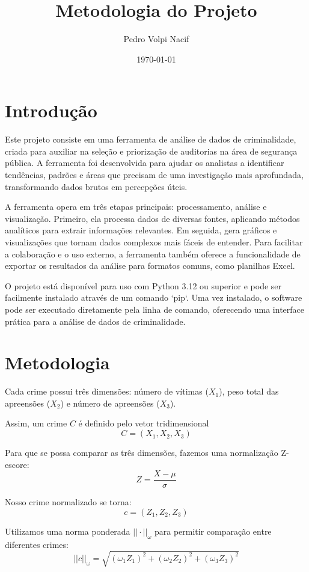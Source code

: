 \documentclass[12pt, a4paper]{article}
\author{Pedro Volpi Nacif}
\title{Metodologia do Projeto}
\date{\today}
\begin{document}
\maketitle

\section{Introdução}
\label{sec:introducao}
Este projeto consiste em uma ferramenta de análise de dados de criminalidade, criada para auxiliar na seleção e priorização de auditorias na área de segurança pública. A ferramenta foi desenvolvida para ajudar os analistas a identificar tendências, padrões e áreas que precisam de uma investigação mais aprofundada, transformando dados brutos em percepções úteis.

A ferramenta opera em três etapas principais: processamento, análise e visualização. Primeiro, ela processa dados de diversas fontes, aplicando métodos analíticos para extrair informações relevantes. Em seguida, gera gráficos e visualizações que tornam dados complexos mais fáceis de entender. Para facilitar a colaboração e o uso externo, a ferramenta também oferece a funcionalidade de exportar os resultados da análise para formatos comuns, como planilhas Excel.

O projeto está disponível para uso com Python 3.12 ou superior e pode ser facilmente instalado através de um comando `pip`. Uma vez instalado, o software pode ser executado diretamente pela linha de comando, oferecendo uma interface prática para a análise de dados de criminalidade.

\section{Metodologia}
\label{sec:metodologia}
Cada crime possui três dimensões: número de vítimas (\( X_1 \)), peso total das apreensões (\( X_2 \)) e número de apreensões (\( X_3 \)).

Assim, um crime \( C \) é definido pelo vetor tridimensional
\[
    C = \left( X_{1}, X_{2}, X_{3} \right)
\]

Para que se possa comparar as três dimensões, fazemos uma normalização Z-escore:
\[
    Z = \frac{ X - \mu }{ \sigma }
\]

Nosso crime normalizado se torna:
\[
    c = \left( Z_1, Z_2, Z_3 \right)
\]

Utilizamos uma norma ponderada \( || \cdot ||_\omega \) para permitir comparação entre diferentes crimes:
\[
    || c ||_\omega = \sqrt{(\omega_1 Z_1)^2 + (\omega_2 Z_2)^2 + (\omega_3 Z_3)^{2}}
\]
\end{document}
